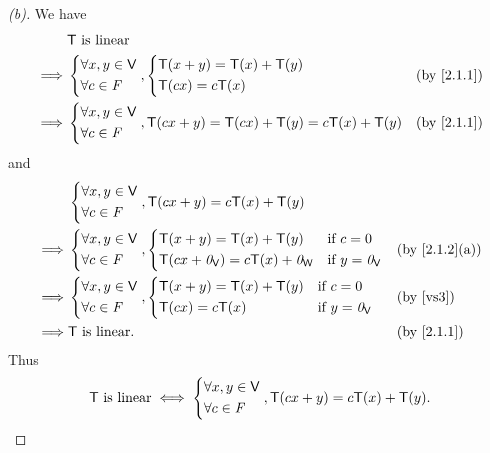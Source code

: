 \begin{proof}[(b)]
  We have
  \begin{align*}
             & \T \text{ is linear}                                                                                  \\
    \implies & \begin{dcases}
      \forall x, y \in \V \\
      \forall c \in \F
    \end{dcases}, \begin{dcases}
      \T(x + y) = \T(x) + \T(y) \\
      \T(cx) = c\T(x)
    \end{dcases}                    &  & \text{(by \cref{2.1.1})} \\
    \implies & \begin{dcases}
      \forall x, y \in \V \\
      \forall c \in \F
    \end{dcases}, \T(cx + y) = \T(cx) + \T(y) = c\T(x) + \T(y) &  & \text{(by \cref{2.1.1})}
  \end{align*}
  and
  \begin{align*}
             & \begin{dcases}
      \forall x, y \in \V \\
      \forall c \in \F
    \end{dcases}, \T(cx + y) = c\T(x) + \T(y)                                  \\
    \implies & \begin{dcases}
      \forall x, y \in \V \\
      \forall c \in \F
    \end{dcases}, \begin{dcases}
      \T(x + y) = \T(x) + \T(y)             & \text{if } c = 0        \\
      \T(cx + \zv_{\V}) = c\T(x) + \zv_{\W} & \text{if } y = \zv_{\V}
    \end{dcases}  &  & \text{(by \cref{2.1.2}(a))} \\
    \implies & \begin{dcases}
      \forall x, y \in \V \\
      \forall c \in \F
    \end{dcases}, \begin{dcases}
      \T(x + y) = \T(x) + \T(y) & \text{if } c = 0        \\
      \T(cx) = c\T(x)           & \text{if } y = \zv_{\V}
    \end{dcases} &  & \text{(by \ref{vs3})}       \\
    \implies & \T \text{ is linear}.                                  &  & \text{(by \cref{2.1.1})}
  \end{align*}
  Thus
  \[
    \mathsf{T} \text{ is linear} \iff \begin{dcases}
      \forall x, y \in \mathsf{V} \\
      \forall c \in \mathit{F}
    \end{dcases}, \mathsf{T}(cx + y) = c\mathsf{T}(x) + \mathsf{T}(y).
  \]
\end{proof}

